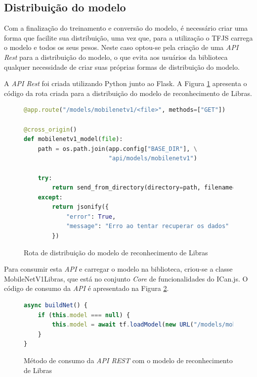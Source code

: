 \subsection{Distribuição do modelo}

\par Com a finalização do treinamento e conversão do modelo, é necessário criar uma forma que facilite sua distribuição, uma vez que, para a utilização o TFJS carrega o modelo e todos os seus pesos. Neste caso optou-se pela criação de uma \textit{API Rest} para a distribuição do modelo, o que evita aos usuários da biblioteca qualquer necessidade de criar suas próprias formas de distribuição do modelo.

\par A \textit{API Rest} foi criada utilizando Python junto ao Flask. A Figura \ref{figure:exemplo_rota_flask} apresenta o código da rota criada para a distribuição do modelo de reconhecimento de Libras.

\begin{figure}[H]
    \centering
    \begin{lstlisting}[language=Python]
@app.route("/models/mobilenetv1/<file>", methods=["GET"])

@cross_origin()
def mobilenetv1_model(file):
    path = os.path.join(app.config["BASE_DIR"], \
                        "api/models/mobilenetv1")

    try:
        return send_from_directory(directory=path, filename=file)
    except:
        return jsonify({
            "error": True,
            "message": "Erro ao tentar recuperar os dados"
        })
    \end{lstlisting}
    \caption{Rota de distribuição do modelo de reconhecimento de Libras}
    \fonte{Produção do autor}
    \label{figure:exemplo_rota_flask}
\end{figure}

\par Para consumir esta \textit{API} e carregar o modelo na biblioteca, criou-se a classe MobileNetV1Libras, que está no conjunto \textit{Core} de funcionalidades do ICan.js. O código de consumo da \textit{API} é apresentado na Figura \ref{figure:exemplo_consome_api}.

\begin{figure}[H]
    \centering
    \begin{lstlisting}[language=Javascript]
async buildNet() {
    if (this.model === null) {
        this.model = await tf.loadModel(new URL("/models/mobilenetv1/model.json", MODEL_URL).href);
    }
}
    \end{lstlisting}
    \caption{Método de consumo da \textit{API REST} com o modelo de reconhecimento de Libras}
    \fonte{Produção do autor}
    \label{figure:exemplo_consome_api}
\end{figure}

